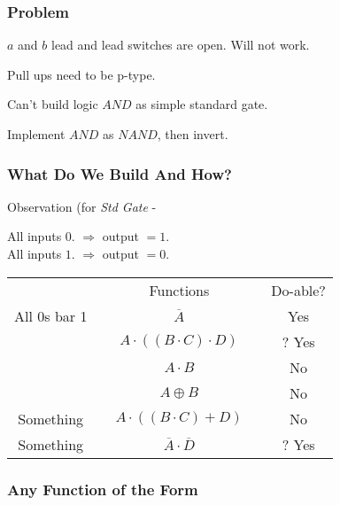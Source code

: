 \documentclass[a4paper,12pt]{article}
\begin{document}
\begin{figure}[hbtp]
\centering 



\end{figure}

\subsubsection*{Problem}

$a$ and $b$ lead and lead switches are open. Will not work.

Pull ups need to be p-type.

Can't build logic $AND$ as simple standard gate.

Implement $AND$ as $NAND$, then invert.

\begin{figure}[hbtp]

\centering 



\label{Inverted NAND Gate} 

\end{figure}

\subsubsection*{What Do We Build And How?}

Observation (for \emph{Std Gate} - 

All inputs $0$. $\Rightarrow$ output $= 1$. \\
All inputs $1$. $\Rightarrow$ output $= 0$.

\begin{tabular}{ccccc}
						&	\hspace{10mm}	&	Functions	&	\hspace{10mm}	&	Do-able?	\\
All $0$s bar 1		&					&	$\overline{A}$	&		&	Yes	\\
				&	& $A \cdot ((B \cdot C) \cdot D)$		&		&	? Yes	\\
					&						&	$A \cdot B$		&		&	No	\\
					&						&	$A \oplus B$		&		&	No	\\
Something		&						&	$A \cdot ((B \cdot C) + D)$	&	&	No	\\
Something		&				&	$\overline{A} \cdot \overline{D}$	& 		& ? Yes
\end{tabular}

\subsubsection*{Any Function of the Form}
\end{document}
